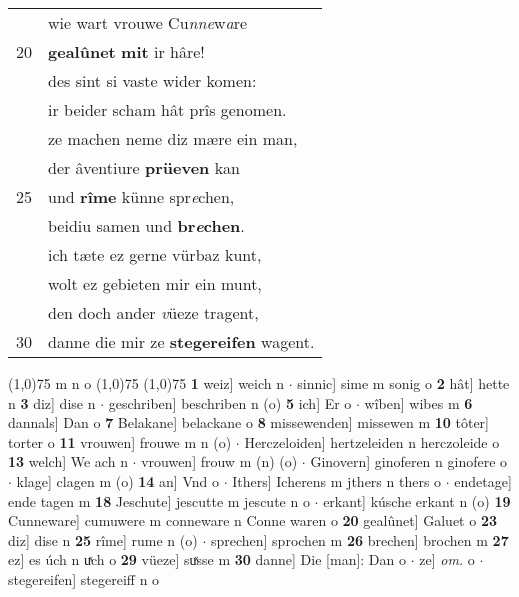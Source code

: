 \documentclass[8pt,a4paper,notitlepage]{article}
\begin{document}
\begin{table}[ht]
\begin{minipage}[t]{0.5\linewidth}
\begin{tabular}{rl}
 & wie wart vrouwe Cu\textit{nne}w\textit{a}re\\ 
20 & \textbf{gealûnet} \textbf{mit} ir hâre!\\ 
 & des sint si vaste wider komen:\\ 
 & ir beider scham hât prîs genomen.\\ 
 & ze machen neme diz mære ein man,\\ 
 & der âventiure \textbf{prüeven} kan\\ 
25 & und \textbf{rîme} künne spr\textit{e}chen,\\ 
 & beidiu samen und \textbf{br\textit{e}chen}.\\ 
 & ich tæte ez gerne vürbaz kunt,\\ 
 & wolt ez gebieten mir ein munt,\\ 
 & den doch ander \textit{v}üeze tragent,\\ 
30 & danne die mir ze \textbf{stegereifen} wagent.\\ 
\end{tabular}
\scriptsize
\line(1,0){75} \newline
m n o \newline
\line(1,0){75} \newline
\newline
\line(1,0){75} \newline
\textbf{1} weiz] weich n  $\cdot$ sinnic] sime m sonig o \textbf{2} hât] hette n \textbf{3} diz] dise n  $\cdot$ geschriben] beschriben n (o) \textbf{5} ich] Er o  $\cdot$ wîben] wibes m \textbf{6} dannals] Dan o \textbf{7} Belakane] belackane o \textbf{8} missewenden] missewen m \textbf{10} tôter] torter o \textbf{11} vrouwen] frouwe m n (o)  $\cdot$ Herczeloiden] hertzeleiden n herczoleide o \textbf{13} welch] We ach n  $\cdot$ vrouwen] frouw m (n) (o)  $\cdot$ Ginovern] ginoferen n ginofere o  $\cdot$ klage] clagen m (o) \textbf{14} an] Vnd o  $\cdot$ Ithers] Icherens m jthers n thers o  $\cdot$ endetage] ende tagen m \textbf{18} Jeschute] jescutte m jescute n o  $\cdot$ erkant] kúsche erkant n (o) \textbf{19} Cunneware] cumuwere m conneware n Conne waren o \textbf{20} gealûnet] Galuet o \textbf{23} diz] dise n \textbf{25} rîme] rume n (o)  $\cdot$ sprechen] sprochen m \textbf{26} brechen] brochen m \textbf{27} ez] es úch n uͯch o \textbf{29} vüeze] suͯsse m \textbf{30} danne] Die [man]: Dan o  $\cdot$ ze] \textit{om.} o  $\cdot$ stegereifen] stegereiff n o \newline
\end{minipage}
\end{table}
\end{document}
